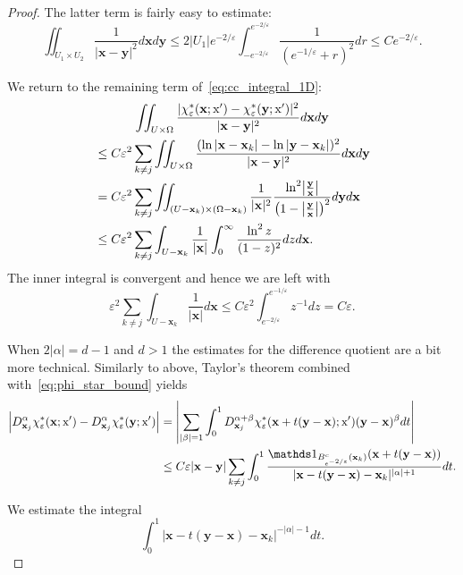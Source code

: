 \documentclass[AHL, Unicode, longabstracts, published]{cedram}
\newcommand*\eps{\varepsilon}
\newcommand\1{{\ensuremath {\mathds 1} }}
\newcommand{\bx}{\mathbf{x}}
\newcommand{\by}{\mathbf{y}}
\newcommand{\sx}{\textup{x}}
\begin{document}
\begin{proof}
The latter term is fairly easy to estimate:
\begin{equation*}
\iint_{U_1\times U_2} \frac{1}{|\bx-\by|^2}d\bx d\by
\leq 2|U_1| e^{-2/\eps}\int_{-e^{-2/\eps}}^{e^{-2/\eps}}\frac{1}{(e^{-1/\eps}+r)^2}dr \leq C e^{-2/\eps}.
\end{equation*}

We return to the remaining term of~\eqref{eq:cc_integral_1D}:
\begin{multline*}
\iint_{U\times \Omega}\frac{|\chi_\eps^*(\bx; \sx')-\chi_\eps^*(\by; \sx')|^2}{|\bx-\by|^2}d\bx d\by \\
\begin{aligned}
&\leq C\eps^2\sum_{k\neq j} \iint_{U\times \Omega} \frac{(\ln|\bx-\bx_k|-\ln|\by-\bx_k|)^2}{|\bx-\by|^2}d\bx d\by\\
&= C\eps^2 \sum_{k\neq j} \iint_{(U-\bx_k)\times(\Omega-\bx_k)}\frac{1}{|\bx|^2}\frac{\ln^2\bigl|\frac{\by}{\bx}\bigr|}{\bigl(1-\bigl|\frac{\by}{\bx}\bigr|\bigr)^2}d\by d\bx\\
&\leq C\eps^2\sum_{k\neq j} \int_{U-\bx_k}\frac{1}{|\bx|}\int_{0}^{\infty}\frac{\ln^2z}{(1-z)^2}dz d\bx.
\end{aligned}
\end{multline*}
The inner integral is convergent and hence we are left with
\begin{equation*}
\eps^2\sum_{k\neq j} \int_{U-\bx_k}\frac{1}{|\bx|} d\bx
\leq C\eps^2 \int_{e^{-2/\eps}}^{e^{-1/\eps}}z^{-1}dz= C\eps.
\end{equation*}





When $2|\alpha|=d-1$ and $d> 1$ the estimates for the difference quotient are a bit more technical. Similarly to above, Taylor's theorem combined with~\eqref{eq:phi_star_bound} yields
\begin{align*}
\left|D_{\bx_j}^\alpha \chi_\eps^*(\bx; \sx')-D^\alpha_{\bx_j} \chi_\eps^*(\by; \sx')\right| &=
\left|
\sum_{|\beta|=1}\int_0^1 D^{\alpha+\beta}_{\bx_j}\chi_\eps^*(\bx+t(\by-\bx); \sx')(\by-\bx)^\beta dt
\right|\\
&\leq C\eps |\bx-\by| \sum_{k\neq j}\int_0^1 \frac{\1_{B^c_{e^{-2/\eps}}(\bx_k)}(\bx+t(\by-\bx))}{|\bx-t(\by-\bx)-\bx_k|^{|\alpha|+1}}dt.
\end{align*}

We estimate the integral
\begin{equation*}
\int_0^1 |\bx-t(\by-\bx)-\bx_k|^{-|\alpha|-1}dt.
\end{equation*}


\end{proof}
\end{document}
